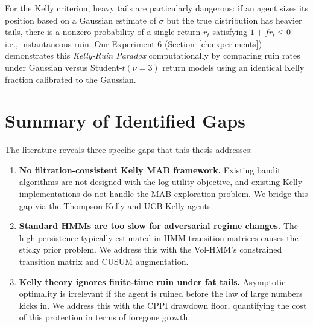 For the Kelly criterion, heavy tails are particularly dangerous: if an agent
sizes its position based on a Gaussian estimate of $\sigma$ but the true
distribution has heavier tails, there is a nonzero probability of a single
return $r_t$ satisfying $1 + f r_t \leq 0$---i.e., instantaneous ruin. Our
Experiment 6 (Section~\ref{ch:experiments}) demonstrates this
\emph{Kelly-Ruin Paradox} computationally by comparing ruin rates under
Gaussian versus Student-$t(\nu=3)$ return models using an identical Kelly
fraction calibrated to the Gaussian.

\section{Summary of Identified Gaps}

The literature reveals three specific gaps that this thesis addresses:

\begin{enumerate}
    \item \textbf{No filtration-consistent Kelly MAB framework.} Existing
    bandit algorithms are not designed with the log-utility objective, and
    existing Kelly implementations do not handle the MAB exploration problem.
    We bridge this gap via the Thompson-Kelly and UCB-Kelly agents.

    \item \textbf{Standard HMMs are too slow for adversarial regime changes.}
    The high persistence typically estimated in HMM transition matrices causes
    the sticky prior problem. We address this with the Vol-HMM's constrained
    transition matrix and CUSUM augmentation.

    \item \textbf{Kelly theory ignores finite-time ruin under fat tails.}
    Asymptotic optimality is irrelevant if the agent is ruined before the law
    of large numbers kicks in. We address this with the CPPI drawdown floor,
    quantifying the cost of this protection in terms of foregone growth.
\end{enumerate}
